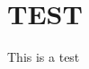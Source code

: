 \chapter{TEST}
\hypertarget{md_docs_2pages_2test_2TEST}{}\label{md_docs_2pages_2test_2TEST}
This is a test 